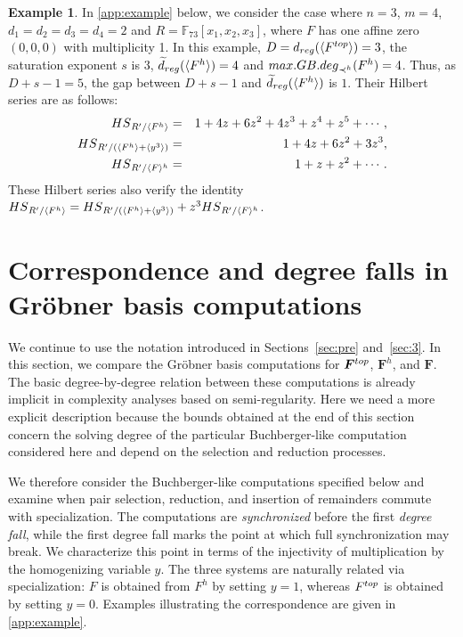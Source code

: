 \documentclass{article}
\theoremstyle{definition}
\newtheorem{example}[theorem]{Example}
\theoremstyle{plain}
\theoremstyle{plain}
\theoremstyle{plain}
\theoremstyle{plain}
\numberwithin{equation}{subsection}
\begin{document}
\begin{example}
In \ref{app:example} below, we consider the case where $n=3$, $m=4$, $d_1=d_2=d_3=d_4=2$ and $R=\mathbb{F}_{73}[x_1,x_2,x_3]$, where $F$ has one affine zero $(0,0,0)$ with multiplicity 1. 
In this example, $D=d_{\rm reg}(\langle F^{\rm top} \rangle)=3$, the saturation exponent $s$ is $3$, $\widetilde{d}_{\rm reg}(\langle F^h \rangle)=4$ and ${\rm max.GB.deg}_{\prec^h}(F^h)=4$.
Thus, as $D+s-1=5$, the gap between $D+s-1$ and $\widetilde{d}_{\rm reg}(\langle F^h\rangle)$ is $1$. 
Their Hilbert series are as follows:
\begin{eqnarray*}
{\rm HS}_{R'/\langle F^h\rangle} & = & 1+4z+6z^2+4z^3+z^4+z^5+\cdots,\\
{\rm HS}_{R'/(\langle F^h\rangle +\langle y^3\rangle)} & = & {1+  4z + 6z^2 + 3z^3},\\
{\rm HS}_{R'/\langle F\rangle^h} & = & 1+z+z^2+\cdots.
\end{eqnarray*}
These Hilbert series also verify the identity ${\rm HS}_{R'/\langle F^h\rangle} ={\rm HS}_{R'/(\langle F^h\rangle +\langle y^3\rangle)}+z^3{\rm HS}_{R'/\langle F\rangle^h}$. 
\end{example}

\section{Correspondence and degree falls in Gr\"{o}bner basis computations}\label{sec:app}

We continue to use the notation introduced in Sections~\ref{sec:pre} and~\ref{sec:3}.
In this section, we compare the Gr\"obner basis computations for $\bm F^{\rm top}$, $\bm F^h$, and $\bm F$.
The basic degree-by-degree relation between these computations is already implicit in complexity analyses based on semi-regularity.
Here we need a more explicit description because the bounds obtained at the end of this section concern the solving degree of the particular Buchberger-like computation considered here and depend on the selection and reduction processes.

We therefore consider the Buchberger-like computations specified below and examine when pair selection, reduction, and insertion of remainders commute with specialization.
The computations are {\em synchronized} before the first {\em degree fall}, while the first degree fall marks the point at which full synchronization may break.
We characterize this point in terms of the injectivity of multiplication by the homogenizing variable $y$.
The three systems are naturally related via specialization: $F$ is obtained from $F^h$ by setting $y=1$, whereas $F^{\rm top}$ is obtained by setting $y=0$.
Examples illustrating the correspondence are given in \ref{app:example}.
\end{document}
